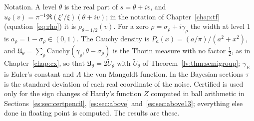 Notation. A level $\theta$ is the real part of $s=\theta+iv$, and $u_\theta(v)=\pi^{-1}\Re(\xi'/\xi)(\theta+iv)$; in the notation of Chapter~\ref{chap:tf} (equation~\eqref{eq:rho}) it is $\rho_{\theta-1/2}(v)$. For a zero $\rho=\sigma_\rho+i\gamma_\rho$ the width at level $1$ is $a_\rho=1-\sigma_\rho\in(0,1)$. The Cauchy density is $P_a(x)=(a/\pi)/(a^2+x^2)$, and $\mathfrak U_\theta=\sum_\rho\mathrm{Cauchy}(\gamma_\rho,\theta-\sigma_\rho)$ is the Thorin measure with no factor $\tfrac12$, as in Chapter~\ref{chap:cx}, so that $\mathfrak U_\theta=2\widetilde U_\theta$ with $\widetilde U_\theta$ of Theorem~\ref{lv:thm:semigroup}; $\gamma_E$ is Euler's constant and $\Lambda$ the von Mangoldt function. In the Bayesian sections $\tau$ is the standard deviation of each real coordinate of the noise. Certified is used only for the sign changes of Hardy's function $Z$ computed in ball arithmetic in Sections~\ref{es:sec:certpencil}, \ref{es:sec:above} and~\ref{es:sec:above13}; everything else done in floating point is computed. The results are these.
